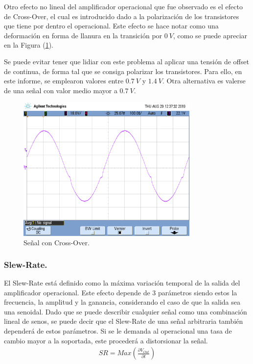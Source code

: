 Otro efecto no lineal del amplificador operacional que fue observado es el efecto de Cross-Over, el cual es introducido dado a la polarización de los transistores que tiene por dentro el operacional. Este efecto se hace notar como una deformación en forma de llanura en la transición por $0 \ V$, como se puede apreciar en la Figura (\ref{fig:co}).

Se puede evitar tener que lidiar con este problema al aplicar una tensión de offset de continua, de forma tal que se consiga polarizar los transistores. Para ello, en este informe, se emplearon valores entre $0.7 \ V$ y $1.4 \ V$. Otra alternativa es valerse de una señal con valor medio mayor a $0.7 \ V$. 
\begin{figure}[H]	
	\centering
	\includegraphics[width=0.8\textwidth, trim = {0 3.3cm 0 2cm},clip]{Ejercicio1/Imagenes/CrossOver.png}
	\caption{Señal con Cross-Over.}
	\label{fig:co}
\end{figure} 

\subsubsection{Slew-Rate.}
El Slew-Rate está definido como la máxima variación temporal de la salida del amplificador operacional. Este efecto depende de 3 parámetros siendo estos la frecuencia, la amplitud y la ganancia, considerando el caso de que la salida sea una senoidal. Dado que se puede describir cualquier señal como una combinación lineal de senos, se puede decir que el Slew-Rate de una señal arbitraria también dependerá de estos parámetros. Si se le demanda al operacional una tasa de cambio mayor a la soportada, este procederá a distorsionar la señal.
\begin{align}
	SR= Max\left( \frac{\partial V_{Out}}{\partial t}\right)
\end{align}

